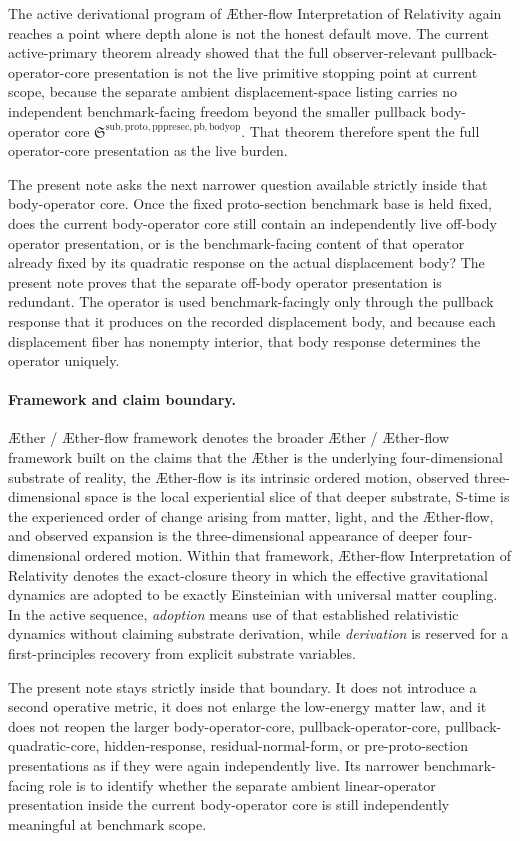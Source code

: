 \documentclass[11pt]{article}
\newcommand{\Aether}{\AE{}ther}
\newcommand{\Aflow}{\AE{}ther-flow}
\newcommand{\TheoryName}{\Aflow{} Interpretation of Relativity}
\newcommand{\TheoryProgram}{\Aether{} / \Aflow{} framework}
\newcommand{\PullbackBodyOperatorCore}{\mathfrak S^{\mathrm{sub,proto,pppresec,pb,bodyop}}}
\begin{document}
The active derivational program of \TheoryName{} again reaches a point where depth alone is not the honest default move. The current active-primary theorem already showed that the full observer-relevant pullback-operator-core presentation is not the live primitive stopping point at current scope, because the separate ambient displacement-space listing carries no independent benchmark-facing freedom beyond the smaller pullback body-operator core \(\PullbackBodyOperatorCore\). That theorem therefore spent the full operator-core presentation as the live burden.

The present note asks the next narrower question available strictly inside that body-operator core. Once the fixed proto-section benchmark base is held fixed, does the current body-operator core still contain an independently live off-body operator presentation, or is the benchmark-facing content of that operator already fixed by its quadratic response on the actual displacement body? The present note proves that the separate off-body operator presentation is redundant. The operator is used benchmark-facingly only through the pullback response that it produces on the recorded displacement body, and because each displacement fiber has nonempty interior, that body response determines the operator uniquely.

\paragraph{Framework and claim boundary.}
\TheoryProgram{} denotes the broader \Aether{} / \Aflow{} framework built on the claims that the \Aether{} is the underlying four-dimensional substrate of reality, the \Aflow{} is its intrinsic ordered motion, observed three-dimensional space is the local experiential slice of that deeper substrate, S-time is the experienced order of change arising from matter, light, and the \Aflow{}, and observed expansion is the three-dimensional appearance of deeper four-dimensional ordered motion. Within that framework, \TheoryName{} denotes the exact-closure theory in which the effective gravitational dynamics are adopted to be exactly Einsteinian with universal matter coupling. In the active sequence, \emph{adoption} means use of that established relativistic dynamics without claiming substrate derivation, while \emph{derivation} is reserved for a first-principles recovery from explicit substrate variables.

The present note stays strictly inside that boundary. It does not introduce a second operative metric, it does not enlarge the low-energy matter law, and it does not reopen the larger body-operator-core, pullback-operator-core, pullback-quadratic-core, hidden-response, residual-normal-form, or pre-proto-section presentations as if they were again independently live. Its narrower benchmark-facing role is to identify whether the separate ambient linear-operator presentation inside the current body-operator core is still independently meaningful at benchmark scope.
\end{document}
